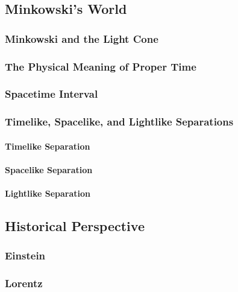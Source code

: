 \documentclass[a4paper]{article}
\begin{document}
\subsection{Minkowski's World}
\subsubsection{Minkowski and the Light Cone}
\subsubsection{The Physical Meaning of Proper Time}
\subsubsection{Spacetime Interval}
\subsubsection{Timelike, Spacelike, and Lightlike Separations}
\paragraph{Timelike Separation}
\paragraph{Spacelike Separation}
\paragraph{Lightlike Separation}
\subsection{Historical Perspective}
\subsubsection{Einstein}
\subsubsection{Lorentz}
\end{document}

